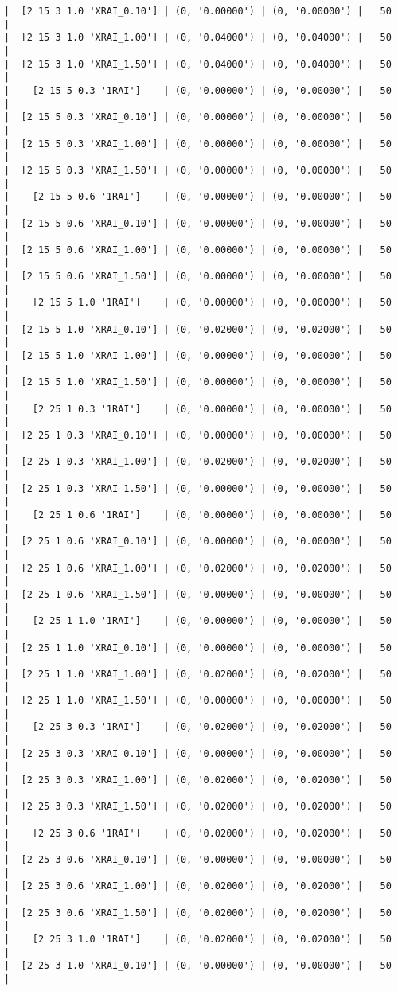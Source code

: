 \documentclass{article}
\begin{document}
\begin{verbatim}
|  [2 15 3 1.0 'XRAI_0.10'] | (0, '0.00000') | (0, '0.00000') |   50  |
|  [2 15 3 1.0 'XRAI_1.00'] | (0, '0.04000') | (0, '0.04000') |   50  |
|  [2 15 3 1.0 'XRAI_1.50'] | (0, '0.04000') | (0, '0.04000') |   50  |
|    [2 15 5 0.3 '1RAI']    | (0, '0.00000') | (0, '0.00000') |   50  |
|  [2 15 5 0.3 'XRAI_0.10'] | (0, '0.00000') | (0, '0.00000') |   50  |
|  [2 15 5 0.3 'XRAI_1.00'] | (0, '0.00000') | (0, '0.00000') |   50  |
|  [2 15 5 0.3 'XRAI_1.50'] | (0, '0.00000') | (0, '0.00000') |   50  |
|    [2 15 5 0.6 '1RAI']    | (0, '0.00000') | (0, '0.00000') |   50  |
|  [2 15 5 0.6 'XRAI_0.10'] | (0, '0.00000') | (0, '0.00000') |   50  |
|  [2 15 5 0.6 'XRAI_1.00'] | (0, '0.00000') | (0, '0.00000') |   50  |
|  [2 15 5 0.6 'XRAI_1.50'] | (0, '0.00000') | (0, '0.00000') |   50  |
|    [2 15 5 1.0 '1RAI']    | (0, '0.00000') | (0, '0.00000') |   50  |
|  [2 15 5 1.0 'XRAI_0.10'] | (0, '0.02000') | (0, '0.02000') |   50  |
|  [2 15 5 1.0 'XRAI_1.00'] | (0, '0.00000') | (0, '0.00000') |   50  |
|  [2 15 5 1.0 'XRAI_1.50'] | (0, '0.00000') | (0, '0.00000') |   50  |
|    [2 25 1 0.3 '1RAI']    | (0, '0.00000') | (0, '0.00000') |   50  |
|  [2 25 1 0.3 'XRAI_0.10'] | (0, '0.00000') | (0, '0.00000') |   50  |
|  [2 25 1 0.3 'XRAI_1.00'] | (0, '0.02000') | (0, '0.02000') |   50  |
|  [2 25 1 0.3 'XRAI_1.50'] | (0, '0.00000') | (0, '0.00000') |   50  |
|    [2 25 1 0.6 '1RAI']    | (0, '0.00000') | (0, '0.00000') |   50  |
|  [2 25 1 0.6 'XRAI_0.10'] | (0, '0.00000') | (0, '0.00000') |   50  |
|  [2 25 1 0.6 'XRAI_1.00'] | (0, '0.02000') | (0, '0.02000') |   50  |
|  [2 25 1 0.6 'XRAI_1.50'] | (0, '0.00000') | (0, '0.00000') |   50  |
|    [2 25 1 1.0 '1RAI']    | (0, '0.00000') | (0, '0.00000') |   50  |
|  [2 25 1 1.0 'XRAI_0.10'] | (0, '0.00000') | (0, '0.00000') |   50  |
|  [2 25 1 1.0 'XRAI_1.00'] | (0, '0.02000') | (0, '0.02000') |   50  |
|  [2 25 1 1.0 'XRAI_1.50'] | (0, '0.00000') | (0, '0.00000') |   50  |
|    [2 25 3 0.3 '1RAI']    | (0, '0.02000') | (0, '0.02000') |   50  |
|  [2 25 3 0.3 'XRAI_0.10'] | (0, '0.00000') | (0, '0.00000') |   50  |
|  [2 25 3 0.3 'XRAI_1.00'] | (0, '0.02000') | (0, '0.02000') |   50  |
|  [2 25 3 0.3 'XRAI_1.50'] | (0, '0.02000') | (0, '0.02000') |   50  |
|    [2 25 3 0.6 '1RAI']    | (0, '0.02000') | (0, '0.02000') |   50  |
|  [2 25 3 0.6 'XRAI_0.10'] | (0, '0.00000') | (0, '0.00000') |   50  |
|  [2 25 3 0.6 'XRAI_1.00'] | (0, '0.02000') | (0, '0.02000') |   50  |
|  [2 25 3 0.6 'XRAI_1.50'] | (0, '0.02000') | (0, '0.02000') |   50  |
|    [2 25 3 1.0 '1RAI']    | (0, '0.02000') | (0, '0.02000') |   50  |
|  [2 25 3 1.0 'XRAI_0.10'] | (0, '0.00000') | (0, '0.00000') |   50  |

\end{verbatim}
\end{document}
